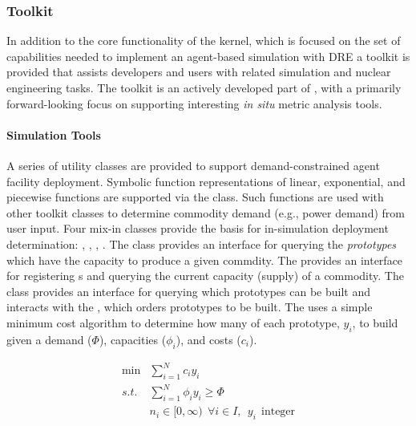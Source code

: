 \subsubsection{Toolkit}

In addition to the core functionality of the \Cyclus kernel, which is focused on
the set of capabilities needed to implement an agent-based simulation
with \gls{DRE} a toolkit is provided that assists developers
and users with related simulation and nuclear engineering tasks. The toolkit is
an actively developed part of \Cyclus, with a primarily forward-looking
focus on supporting interesting \textit{in situ} metric analysis tools.

\paragraph{Simulation Tools}

A series of utility classes are provided to support demand-constrained agent
facility deployment. Symbolic function representations of linear,
exponential, and piecewise functions are supported via the
 class. Such functions are used with other toolkit
classes to determine commodity demand (e.g., power demand) from user input. Four
mix-in classes provide the basis for in-simulation deployment determination:
, , ,
. The  class provides an
interface for querying the \textit{prototypes} which have the
capacity to produce a given commdity. The 
provides an interface for registering s and querying
the current capacity (supply) of a commodity. The  class provides
an interface for querying which prototypes can be built and interacts with the
, which orders prototypes to be built. The
 uses a simple minimum cost algorithm to determine how
many of each prototype, $y_i$, to build given a demand ($\Phi$), capacities
($\phi_i$), and costs ($c_i$).

\begin{equation}
\begin{aligned}
 \min & \sum_{i=1}^{N}c_i y_i \\
 s.t. & \sum_{i=1}^{N}\phi_i y_i \ge \Phi \\
      & n_i \in [0,\infty) \:\: \forall i \in I, \:\: y_i \:\: \text{integer}
\end{aligned}
\end{equation}

